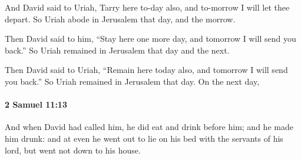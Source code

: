 			\begin{versebox}
					\item[BHS] 
					\item[ASV] And David said to Uriah, Tarry here to-day also, and to-morrow I will let thee depart. So Uriah abode in Jerusalem that day, and the morrow.
					\item[NIV] Then David said to him, “Stay here one more day, and tomorrow I will send you back.” So Uriah remained in Jerusalem that day and the next.
					\item[NRSV] Then David said to Uriah, “Remain here today also, and tomorrow I will send you back.” So Uriah remained in Jerusalem that day. On the next day,
			\end{versebox}

		\paragraph{2 Samuel 11:13} %
			\label{2SAMUEL-11-13}

			And when David had called him, he did eat and drink before him; and he made him drunk: and at even he went out to lie on his bed with the servants of his lord, but went not down to his house.

